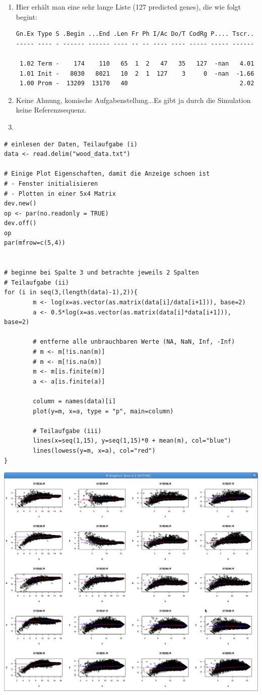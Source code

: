 \documentclass{homework}
\begin{document}
\begin{enumerate}
\begin{enumerate}
\item 
Hier erhält man eine sehr lange Liste (127 predicted genes), die wie folgt begint:
\begin{verbatim}
Gn.Ex Type S .Begin ...End .Len Fr Ph I/Ac Do/T CodRg P.... Tscr..
----- ---- - ------ ------ ---- -- -- ---- ---- ----- ----- ------

 1.02 Term -    174    110   65  1  2   47   35   127  -nan   4.01
 1.01 Init -   8030   8021   10  2  1  127    3     0  -nan  -1.66
 1.00 Prom -  13209  13170   40                               2.02
\end{verbatim}
\item 
Keine Ahnung, komische Aufgabenstellung...Es gibt ja durch die Simulation keine Referenzsequenz. 
\item 
\end{enumerate}


\begin{verbatim}
# einlesen der Daten, Teilaufgabe (i)
data <- read.delim("wood_data.txt")

# Einige Plot Eigenschaften, damit die Anzeige schoen ist
# - Fenster initialisieren
# - Plotten in einer 5x4 Matrix
dev.new()
op <- par(no.readonly = TRUE)
dev.off()
op
par(mfrow=c(5,4))


# beginne bei Spalte 3 und betrachte jeweils 2 Spalten
# Teilaufgabe (ii)
for (i in seq(3,(length(data)-1),2)){
		m <- log(x=as.vector(as.matrix(data[i]/data[i+1])), base=2)
		a <- 0.5*log(x=as.vector(as.matrix(data[i]*data[i+1])), base=2)
	
		# entferne alle unbrauchbaren Werte (NA, NaN, Inf, -Inf)
		# m <- m[!is.nan(m)]
		# m <- m[!is.na(m)]
		m <- m[is.finite(m)]
		a <- a[is.finite(a)]
		
		column = names(data)[i]				
		plot(y=m, x=a, type = "p", main=column)	

        # Teilaufgabe (iii)
		lines(x=seq(1,15), y=seq(1,15)*0 + mean(m), col="blue")
		lines(lowess(y=m, x=a), col="red")
}
\end{verbatim}

\includegraphics[scale=0.3]{../data/aufg_37}


\end{enumerate}
\end{document}
